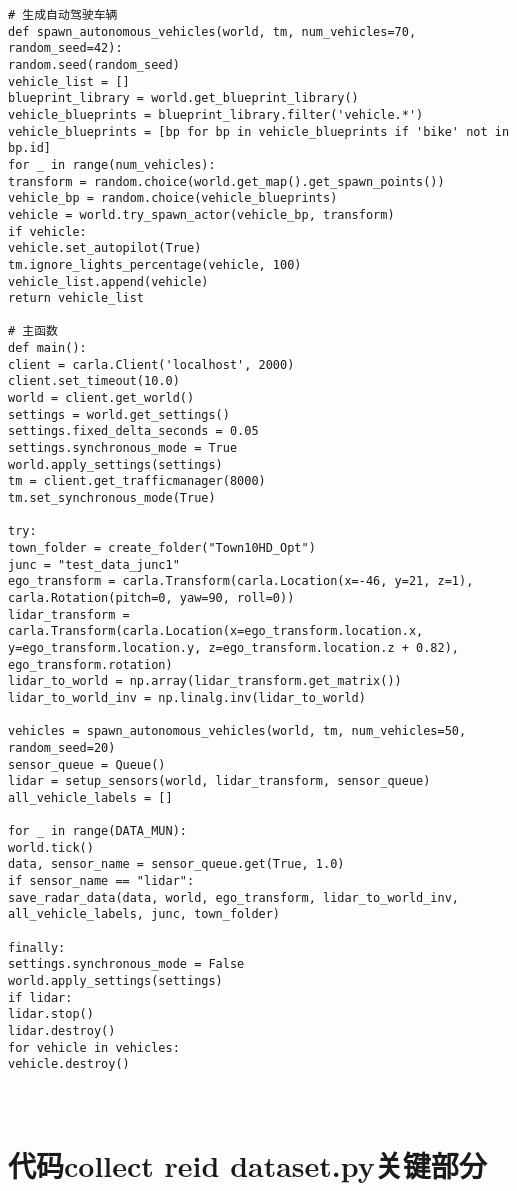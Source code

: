 \begin{lstlisting}
# 生成自动驾驶车辆
def spawn_autonomous_vehicles(world, tm, num_vehicles=70, random_seed=42):
random.seed(random_seed)
vehicle_list = []
blueprint_library = world.get_blueprint_library()
vehicle_blueprints = blueprint_library.filter('vehicle.*')
vehicle_blueprints = [bp for bp in vehicle_blueprints if 'bike' not in bp.id]
for _ in range(num_vehicles):
transform = random.choice(world.get_map().get_spawn_points())
vehicle_bp = random.choice(vehicle_blueprints)
vehicle = world.try_spawn_actor(vehicle_bp, transform)
if vehicle:
vehicle.set_autopilot(True)
tm.ignore_lights_percentage(vehicle, 100)
vehicle_list.append(vehicle)
return vehicle_list

# 主函数
def main():
client = carla.Client('localhost', 2000)
client.set_timeout(10.0)
world = client.get_world()
settings = world.get_settings()
settings.fixed_delta_seconds = 0.05
settings.synchronous_mode = True
world.apply_settings(settings)
tm = client.get_trafficmanager(8000)
tm.set_synchronous_mode(True)

try:
town_folder = create_folder("Town10HD_Opt")
junc = "test_data_junc1"
ego_transform = carla.Transform(carla.Location(x=-46, y=21, z=1), carla.Rotation(pitch=0, yaw=90, roll=0))
lidar_transform = carla.Transform(carla.Location(x=ego_transform.location.x, y=ego_transform.location.y, z=ego_transform.location.z + 0.82), ego_transform.rotation)
lidar_to_world = np.array(lidar_transform.get_matrix())
lidar_to_world_inv = np.linalg.inv(lidar_to_world)

vehicles = spawn_autonomous_vehicles(world, tm, num_vehicles=50, random_seed=20)
sensor_queue = Queue()
lidar = setup_sensors(world, lidar_transform, sensor_queue)
all_vehicle_labels = []

for _ in range(DATA_MUN):
world.tick()
data, sensor_name = sensor_queue.get(True, 1.0)
if sensor_name == "lidar":
save_radar_data(data, world, ego_transform, lidar_to_world_inv, all_vehicle_labels, junc, town_folder)

finally:
settings.synchronous_mode = False
world.apply_settings(settings)
if lidar:
lidar.stop()
lidar.destroy()
for vehicle in vehicles:
vehicle.destroy()

	

\end{lstlisting}

\section{代码collect reid dataset.py关键部分}

